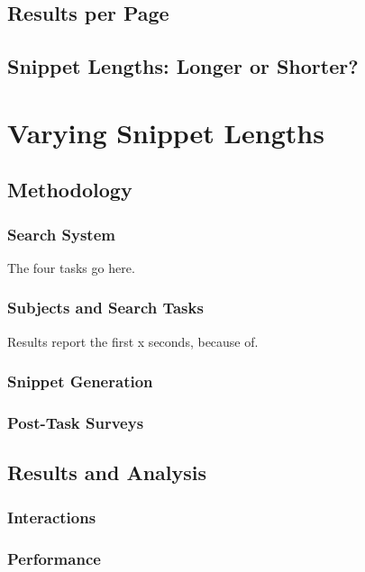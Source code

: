 \subsection{Results per Page}

\subsection{Snippet Lengths: Longer or Shorter?}

\section{Varying Snippet Lengths}\label{chap:snippets:user}

\subsection{Methodology}

\subsubsection{Search System}
The four tasks go here.

\subsubsection{Subjects and Search Tasks}
Results report the first x seconds, because of.

\subsubsection{Snippet Generation}

\subsubsection{Post-Task Surveys}

\subsection{Results and Analysis}

\subsubsection{Interactions}

\subsubsection{Performance}

